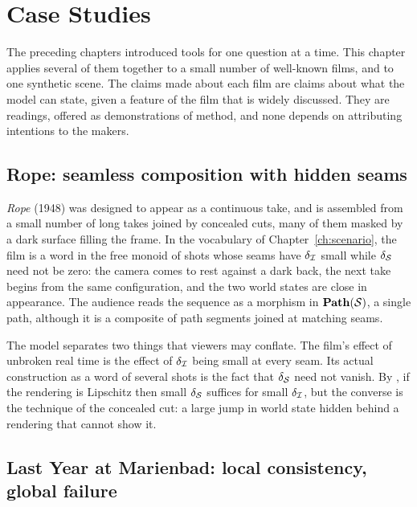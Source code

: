 \chapter{Case Studies}
\label{ch:cases}

The preceding chapters introduced tools for one question at a time. This chapter applies several of them together to a small number of well-known films, and to one synthetic scene. The claims made about each film are claims about what the model can state, given a feature of the film that is widely discussed. They are readings, offered as demonstrations of method, and none depends on attributing intentions to the makers.

\section{Rope: seamless composition with hidden seams}

\emph{Rope} (1948) was designed to appear as a continuous take, and is assembled from a small number of long takes joined by concealed cuts, many of them masked by a dark surface filling the frame. In the vocabulary of Chapter~\ref{ch:scenario}, the film is a word in the free monoid of shots whose seams have $\delta_{\mathcal{I}}$ small while $\delta_{\mathcal{S}}$ need not be zero: the camera comes to rest against a dark back, the next take begins from the same configuration, and the two world states are close in appearance. The audience reads the sequence as a morphism in $\mathbf{Path}(\mathcal{S})$, a single path, although it is a composite of path segments joined at matching seams.

The model separates two things that viewers may conflate. The film's effect of unbroken real time is the effect of $\delta_{\mathcal{I}}$ being small at every seam. Its actual construction as a word of several shots is the fact that $\delta_{\mathcal{S}}$ need not vanish. By , if the rendering is Lipschitz then small $\delta_{\mathcal{S}}$ suffices for small $\delta_{\mathcal{I}}$, but the converse is the technique of the concealed cut: a large jump in world state hidden behind a rendering that cannot show it.

\section{Last Year at Marienbad: local consistency, global failure}

